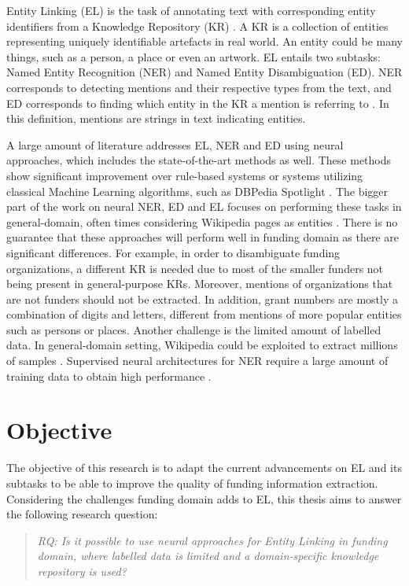 \documentclass{report}
\theoremstyle{definition}
\theoremstyle{remark}
\begin{document}
Entity Linking (EL) is the task of annotating text with corresponding entity identifiers from a Knowledge Repository (KR) \cite{balog}. A KR is a collection of entities representing uniquely identifiable artefacts in real world. An entity could be many things, such as a person, a place or even an artwork. EL entails two subtasks: Named Entity Recognition (NER) and Named Entity Disambiguation (ED). NER corresponds to detecting mentions and their respective types from the text, and ED corresponds to finding which entity in the KR a mention is referring to \cite{balog}. In this definition, mentions are strings in text indicating entities.

A large amount of literature addresses EL, NER and ED using neural approaches, which includes the state-of-the-art methods \cite{REL,LUKE,mulang} as well. These methods show significant improvement over rule-based systems or systems utilizing classical Machine Learning algorithms, such as DBPedia Spotlight \cite{dbpediaspotlight}. The bigger part of the work on neural NER, ED and EL focuses on performing these tasks in general-domain, often times considering Wikipedia pages as entities \cite{nlpnotes}. There is no guarantee that these approaches will perform well in funding domain as there are significant differences. For example, in order to disambiguate funding organizations, a different KR is needed due to most of the smaller funders not being present in general-purpose KRs. Moreover, mentions of organizations that are not funders should not be extracted. In addition, grant numbers are mostly a combination of digits and letters, different from mentions of more popular entities such as persons or places. Another challenge is the limited amount of labelled data. In general-domain setting, Wikipedia could be exploited to extract millions of samples \cite{bunescu-pasca-2006-using}. Supervised neural architectures for NER require a large amount of training data to obtain high performance \cite{NERsurvey}. 

\section{Objective}

The objective of this research is to adapt the current advancements on EL and its subtasks to be able to improve the quality of funding information extraction. Considering the challenges funding domain adds to EL, this thesis aims to answer the following research question:

\begin{quote}\emph{RQ: Is it possible to use neural approaches for Entity Linking in funding domain, where labelled data is limited and a domain-specific knowledge repository is used?}\end{quote}
\end{document}
